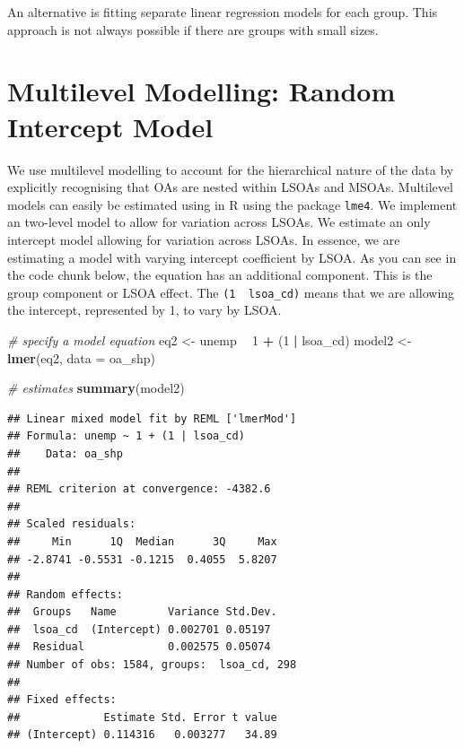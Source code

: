 \documentclass[
]{book}
\newenvironment{Shaded}{\begin{snugshade}}{\end{snugshade}}
\newcommand{\CommentTok}[1]{\textcolor[rgb]{0.56,0.35,0.01}{\textit{#1}}}
\newcommand{\DataTypeTok}[1]{\textcolor[rgb]{0.13,0.29,0.53}{#1}}
\newcommand{\DecValTok}[1]{\textcolor[rgb]{0.00,0.00,0.81}{#1}}
\newcommand{\KeywordTok}[1]{\textcolor[rgb]{0.13,0.29,0.53}{\textbf{#1}}}
\newcommand{\NormalTok}[1]{#1}
\newcommand{\OperatorTok}[1]{\textcolor[rgb]{0.81,0.36,0.00}{\textbf{#1}}}
\newcommand{\StringTok}[1]{\textcolor[rgb]{0.31,0.60,0.02}{#1}}
\begin{document}
An alternative is fitting separate linear regression models for each group. This approach is not always possible if there are groups with small sizes.

\hypertarget{multilevel-modelling-random-intercept-model}{%
\section{Multilevel Modelling: Random Intercept Model}\label{multilevel-modelling-random-intercept-model}}

We use multilevel modelling to account for the hierarchical nature of the data by explicitly recognising that OAs are nested within LSOAs and MSOAs. Multilevel models can easily be estimated using in R using the package \texttt{lme4}. We implement an two-level model to allow for variation across LSOAs. We estimate an only intercept model allowing for variation across LSOAs. In essence, we are estimating a model with varying intercept coefficient by LSOA. As you can see in the code chunk below, the equation has an additional component. This is the group component or LSOA effect. The \texttt{(1\ \textbar{}\ lsoa\_cd)} means that we are allowing the intercept, represented by 1, to vary by LSOA.

\begin{Shaded}
\begin{Highlighting}[]
\CommentTok{# specify a model equation}
\NormalTok{eq2 <-}\StringTok{ }\NormalTok{unemp }\OperatorTok{~}\StringTok{ }\DecValTok{1} \OperatorTok{+}\StringTok{ }\NormalTok{(}\DecValTok{1} \OperatorTok{|}\StringTok{ }\NormalTok{lsoa_cd)}
\NormalTok{model2 <-}\StringTok{ }\KeywordTok{lmer}\NormalTok{(eq2, }\DataTypeTok{data =}\NormalTok{ oa_shp)}

\CommentTok{# estimates}
\KeywordTok{summary}\NormalTok{(model2)}
\end{Highlighting}
\end{Shaded}

\begin{verbatim}
## Linear mixed model fit by REML ['lmerMod']
## Formula: unemp ~ 1 + (1 | lsoa_cd)
##    Data: oa_shp
## 
## REML criterion at convergence: -4382.6
## 
## Scaled residuals: 
##     Min      1Q  Median      3Q     Max 
## -2.8741 -0.5531 -0.1215  0.4055  5.8207 
## 
## Random effects:
##  Groups   Name        Variance Std.Dev.
##  lsoa_cd  (Intercept) 0.002701 0.05197 
##  Residual             0.002575 0.05074 
## Number of obs: 1584, groups:  lsoa_cd, 298
## 
## Fixed effects:
##             Estimate Std. Error t value
## (Intercept) 0.114316   0.003277   34.89
\end{verbatim}
\end{document}

